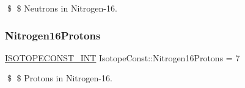 \$ \$ Neutrons in Nitrogen-\/16. \mbox{\label{group___isotope_const-_nitrogen-_n16_gafdc263f19e692f5c2c4063902e6b3f1c}} 
\subsubsection{\texorpdfstring{Nitrogen16\+Protons}{Nitrogen16Protons}}
{\footnotesize\ttfamily \mbox{\hyperlink{group___isotope_const-_macros_ga5f18360b3e99483a35c32d789e62621c}{I\+S\+O\+T\+O\+P\+E\+C\+O\+N\+S\+T\+\_\+\+I\+NT}} Isotope\+Const\+::\+Nitrogen16\+Protons = 7}

\$ \$ Protons in Nitrogen-\/16. 